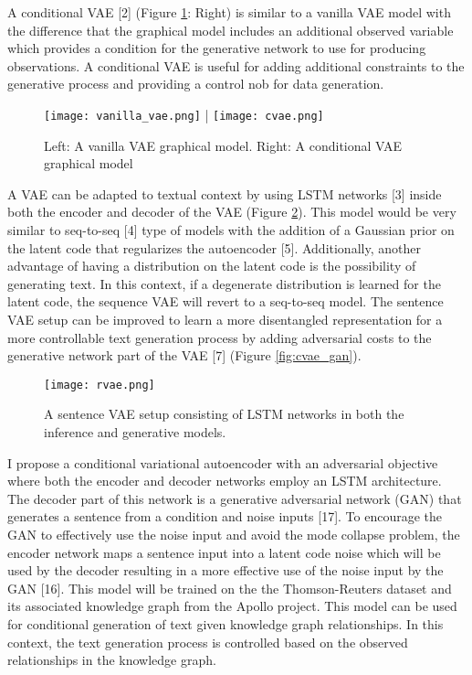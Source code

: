 \documentclass[a4paper]{article}
\begin{document}
A conditional VAE [2] (Figure \ref{fig:vae}: Right) is similar to a vanilla VAE model with the difference that the graphical model includes an additional observed variable which provides a condition for the generative network to use for producing observations. A conditional VAE is useful for adding additional constraints to the generative process and providing a control nob for data generation. 

\begin{figure}
\centering
\texttt{[image: vanilla\_vae.png]} | \texttt{[image: cvae.png]} 
\caption{\label{fig:vae}Left: A vanilla VAE graphical model. Right: A conditional VAE graphical model}
\end{figure}

A VAE can be adapted to textual context by using LSTM networks [3] inside both the encoder and decoder of the VAE (Figure \ref{fig:rvae}). This model would be very similar to seq-to-seq [4] type of models with the addition of a Gaussian prior on the latent code that regularizes the autoencoder [5]. Additionally, another advantage of having a distribution on the latent code is the possibility of generating text. In this context, if a degenerate distribution is learned for the latent code, the sequence VAE will revert to a seq-to-seq model. The sentence VAE setup can be improved to learn a more disentangled representation for a more controllable text generation process by adding adversarial costs to the generative network part of the VAE [7] (Figure \ref{fig:cvae_gan}). 


\begin{figure}
\centering
\texttt{[image: rvae.png]}
\caption{\label{fig:rvae}A sentence VAE setup consisting of LSTM networks in both the inference and generative models.}
\end{figure}


I propose a conditional variational autoencoder with an adversarial objective where  both the encoder and decoder networks employ an LSTM architecture. The decoder part of this network is a generative adversarial network (GAN) that generates a sentence from a condition and noise inputs [17]. To encourage the GAN to effectively use the noise input and avoid the mode collapse problem, the encoder network maps a sentence input into a latent code noise which will be used by the decoder resulting in a more effective use of the noise input by the GAN [16]. This model will be trained on the the Thomson-Reuters dataset and its associated knowledge graph from the Apollo project. This model can be used for conditional generation of text given knowledge graph relationships. In this context, the text generation process is controlled based on the observed relationships in the knowledge graph. 
\end{document}
